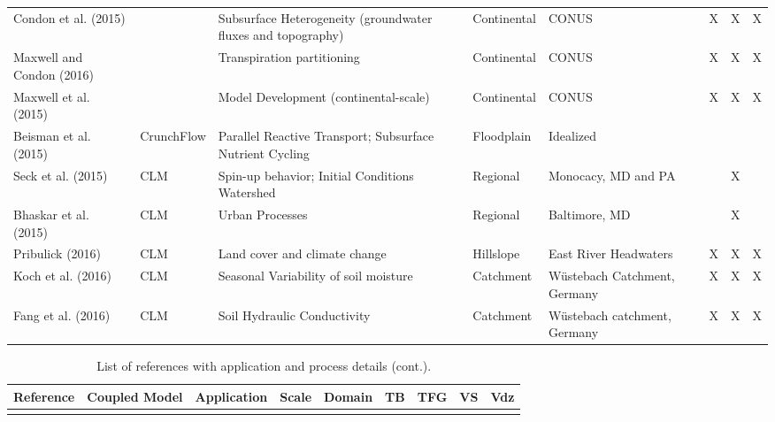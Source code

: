{\begin{table}
\begin{tabular}{ l  p{1.5cm} p{2cm} p{1.5cm} p{1.5cm} | c | c | c | c }
\cite{Condon2015} Condon et al. (2015) & & Subsurface Heterogeneity (groundwater fluxes and topography) & Continental & CONUS & &X &X & X  \\	
\cite{Maxwell2016} Maxwell and Condon (2016) &  & Transpiration partitioning & Continental & CONUS & &X &X &X \\		
\cite{Maxwell2015} Maxwell et al. (2015)& & Model Development (continental-scale) & Continental & CONUS   & &X &X & X \\			
\cite{Beisman2015} Beisman et al. (2015)& CrunchFlow & Parallel Reactive Transport; Subsurface Nutrient Cycling & Floodplain& Idealized  & & & &      \\		
\cite{Seck2015} Seck et al. (2015) & CLM & Spin-up behavior; Initial Conditions Watershed & Regional& Monocacy, MD and PA	& & & X	& \\
\cite{Bhaskar2015} Bhaskar et al. (2015)& CLM & Urban Processes & Regional & Baltimore, MD              & & & X & \\
\cite{Pribulick2016} Pribulick (2016) & CLM & Land cover and climate change & Hillslope & East River Headwaters & &X &X &X \\		
\cite{Koch2016} Koch et al. (2016) & CLM & Seasonal Variability of soil moisture & Catchment & Wüstebach Catchment, Germany & &X &X &X \\		
\cite{Fang2016} Fang et al. (2016) & CLM & Soil Hydraulic Conductivity & Catchment & Wüstebach catchment, Germany & &X &X &X \\	

\end{tabular}
\label{pfref15}
\end{table}


\begin{table} \center
\renewcommand{\arraystretch}{2.5}
\center
\caption{List of \parflow{} references with application and process details (cont.).}
\begin{tabular}{ l  p{1.5cm} p{2cm} p{1.5cm} p{1.5cm} | c | c | c | c }
\bf{Reference} & \bf{Coupled Model} & \bf{Application} & \bf{Scale} & \bf{Domain} & \bf{TB} & \bf{TFG} & \bf{VS} & \bf{Vdz} \\   
\hline{}


\end{tabular}
\end{table}}

